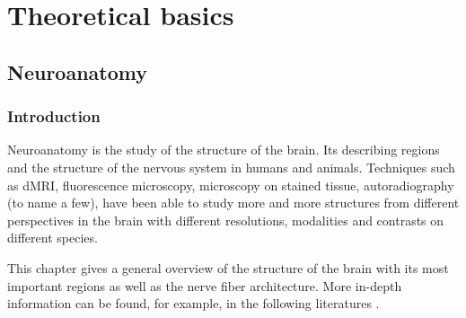 \newpage\null\thispagestyle{empty}\newpage
\clearpage{\thispagestyle{empty}\cleardoublepage}
\part{Theoretical basics}
\parttoc
% 
% 
% 
\cleardoublepage
\setcounter{chapter}{1}
\chapter{Neuroanatomy}
\label{chap:neuro}
%
%
%
\section{Introduction}
%
Neuroanatomy is the study of the structure of the brain.
Its describing regions and the structure of the nervous system in humans and animals.
Techniques such as \ac{dMRI}, fluorescence microscopy, microscopy on stained tissue, autoradiography (to name a few), have been able to study more and more structures from different perspectives in the brain with different resolutions, modalities and contrasts on different species.
% 
\par
%
This chapter gives a general overview of the structure of the brain with its most important regions as well as the nerve fiber architecture.
More in-depth information can be found, for example, in the following literatures \dummy{}.
% 
%
% 
% 
% 
%

